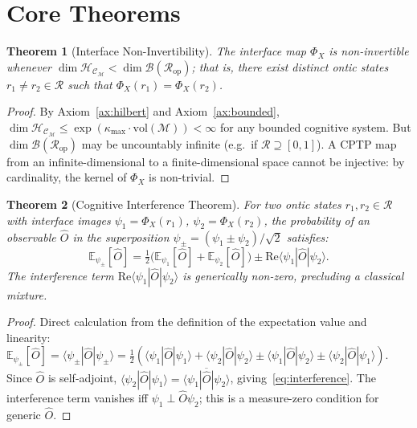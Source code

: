 \documentclass[twocolumn,aps,prd,superscriptaddress,nofootinbib]{revtex4-2}
\newtheorem{theorem}{Theorem}[section]
\newcommand{\HC}{\mathcal{H}_{\mathcal{C}}}
\newcommand{\CR}{\mathcal{R}}
\newcommand{\CM}{\mathcal{M}}
\newcommand{\CB}{\mathcal{B}}
\newcommand{\hatO}{\hat{O}}
\begin{document}
\section{Core Theorems}
\label{sec:theorems}

\begin{theorem}[Interface Non-Invertibility]
\label{thm:noninvert}
The interface map $\Phi_X$ is non-invertible whenever $\dim\HC_\CM <
\dim\CB(\CR_\mathrm{op})$; that is, there exist distinct ontic states
$r_1 \neq r_2 \in \CR$ such that $\Phi_X(r_1) = \Phi_X(r_2)$.
\end{theorem}

\begin{proof}
By Axiom~\ref{ax:hilbert} and Axiom~\ref{ax:bounded}, $\dim\HC_\CM \leq
\exp(\kappa_\mathrm{max}\cdot\mathrm{vol}(\CM)) < \infty$ for any bounded
cognitive system.  But $\dim\CB(\CR_\mathrm{op})$ may be uncountably infinite
(e.g.\ if $\CR \supseteq [0,1]$).  A CPTP map from an infinite-dimensional
to a finite-dimensional space cannot be injective: by cardinality, the kernel
of $\Phi_X$ is non-trivial.
\end{proof}

\begin{theorem}[Cognitive Interference Theorem]
\label{thm:interference}
For two ontic states $r_1, r_2 \in \CR$ with interface images
$\psi_1 = \Phi_X(r_1)$, $\psi_2 = \Phi_X(r_2)$, the probability of an
observable $\hatO$ in the superposition
$\psi_\pm = (\psi_1 \pm \psi_2)/\sqrt{2}$ satisfies:
\begin{equation}
  \mathbb{E}_{\psi_\pm}[\hatO]
    = \tfrac{1}{2}\bigl(\mathbb{E}_{\psi_1}[\hatO] + \mathbb{E}_{\psi_2}[\hatO]\bigr)
      \pm \mathrm{Re}\langle\psi_1|\hatO|\psi_2\rangle.
  \label{eq:interference}
\end{equation}
The interference term $\mathrm{Re}\langle\psi_1|\hatO|\psi_2\rangle$
is generically non-zero, precluding a classical mixture.
\end{theorem}

\begin{proof}
Direct calculation from the definition of the expectation value and linearity:
$\mathbb{E}_{\psi_\pm}[\hatO] = \langle\psi_\pm|\hatO|\psi_\pm\rangle =
\tfrac{1}{2}(\langle\psi_1|\hatO|\psi_1\rangle + \langle\psi_2|\hatO|\psi_2\rangle
\pm \langle\psi_1|\hatO|\psi_2\rangle \pm \langle\psi_2|\hatO|\psi_1\rangle)$.
Since $\hatO$ is self-adjoint, $\langle\psi_2|\hatO|\psi_1\rangle =
\overline{\langle\psi_1|\hatO|\psi_2\rangle}$, giving~\eqref{eq:interference}.
The interference term vanishes iff $\psi_1 \perp \hatO\psi_2$; this is a
measure-zero condition for generic $\hatO$.
\end{proof}
\end{document}
